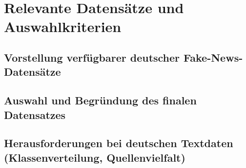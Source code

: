 \chapter{Relevante Datensätze und Auswahlkriterien}
\label{chap:relevante_datensaetze_und_auswahlkriterien}

\section{Vorstellung verfügbarer deutscher Fake-News-Datensätze}
\label{sec:vorstellung_verfuegbare_deutsche_fake_news_datensaetze}

\section{Auswahl und Begründung des finalen Datensatzes}
\label{sec:auswahl_und_begruendung_finaler_datensatz}

\section{Herausforderungen bei deutschen Textdaten (Klassenverteilung, Quellenvielfalt)}
\label{sec:herausforderungen_deutsche_textdaten}